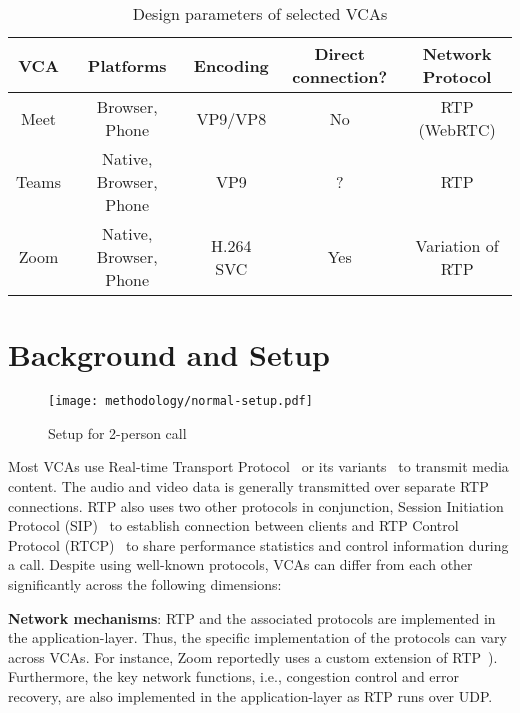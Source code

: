 \begin{table*}[ht!]
\centering
\begin{tabular}{|c|c|c|c|c|}
\hline
\textbf{VCA} & \textbf{Platforms}     & \textbf{Encoding} & \textbf{Direct connection?} & \textbf{Network Protocol} \\ \hline
\hline 
Meet  & Browser, Phone         & VP9/VP8   & No                 & RTP (WebRTC)     \\ \hline
Teams & Native, Browser, Phone & VP9       & ?                  & RTP              \\ \hline
Zoom  & Native, Browser, Phone & H.264 SVC & Yes                & Variation of RTP \\ \hline
\end{tabular}
\caption{Design parameters of selected VCAs}
\label{tab:vca_overview}
\end{table*}

\section{Background and Setup}

\begin{figure}[h]
\centering
\texttt{[image: methodology/normal-setup.pdf]}
\caption{Setup for 2-person call}
\label{fig:static_setup}
\end{figure}


\label{sec:background}
Most VCAs use Real-time Transport Protocol~\cite{schulzrinne1996rtp, schulzrinne2003rfc3550} or its variants~\cite{baugher2004secure, zoom_rtp} to transmit media content. The audio and video data is generally transmitted over separate RTP connections. RTP also uses two other protocols in conjunction, Session Initiation Protocol (SIP)~\cite{rosenberg2002sip} to establish connection between clients and RTP Control Protocol (RTCP)~\cite{schulzrinne2003rfc3550} to share performance statistics and control information during a call. Despite using well-known protocols, VCAs can differ from each other significantly across the following dimensions:



\textbf{Network mechanisms}: RTP and the associated protocols are implemented in the application-layer. Thus, the specific implementation of the protocols can vary across VCAs. For instance, Zoom reportedly uses a custom extension of RTP~\cite{zoom_rtp}). Furthermore, the key network functions, i.e., congestion control and error recovery, are also implemented in the application-layer as RTP runs over UDP.

